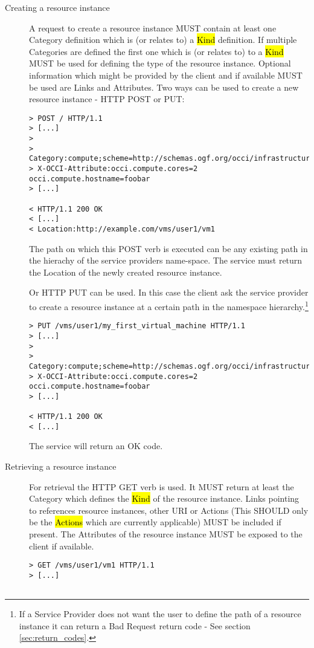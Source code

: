 \documentclass[10pt,a4paper]{article}
\begin{document}
\begin{description}
\item[Creating a resource instance] A request to create a resource
  instance MUST contain at least one Category definition which is (or
  relates to) a \hl{Kind} definition. If multiple Categories are
  defined the first one which is (or relates to) to a \hl{Kind} MUST
  be used for defining the type of the resource instance. Optional
  information which might be provided by the client and if available
  MUST be used are Links and Attributes. Two ways can be used to
  create a new resource instance - HTTP POST or PUT:
\begin{verbatim}
> POST / HTTP/1.1
> [...]
> 
> Category:compute;scheme=http://schemas.ogf.org/occi/infrastructure
> X-OCCI-Attribute:occi.compute.cores=2 occi.compute.hostname=foobar
> [...]
 
< HTTP/1.1 200 OK
< [...]
< Location:http://example.com/vms/user1/vm1
\end{verbatim}
  The path on which this POST verb is executed can be any existing
  path in the hierachy of the service providers name-space. The
  service must return the Location of the newly created resource
  instance.

  Or HTTP PUT can be used. In this case the client ask the service
  provider to create a resource instance at a certain path in the
  namespace hierarchy.\footnote{If a Service Provider does not want the
    user to define the path of a resource instance it can return a Bad
    Request return code - See section \ref{sec:return_codes}.}
\begin{verbatim}
> PUT /vms/user1/my_first_virtual_machine HTTP/1.1
> [...]
> 
> Category:compute;scheme=http://schemas.ogf.org/occi/infrastructure
> X-OCCI-Attribute:occi.compute.cores=2 occi.compute.hostname=foobar
> [...]
 
< HTTP/1.1 200 OK
< [...]
\end{verbatim}
  The service will return an OK code.

\item[Retrieving a resource instance] For retrieval the HTTP GET verb
  is used. It MUST return at least the Category which defines the
  \hl{Kind} of the resource instance. Links pointing to references
  resource instances, other URI or Actions (This SHOULD only be the
  \hl{Actions} which are currently applicable) MUST be included if
  present. The Attributes of the resource instance MUST be exposed to
  the client if available.
\begin{verbatim}
> GET /vms/user1/vm1 HTTP/1.1
> [...]
 

\end{verbatim}
\end{description}
\end{document}
